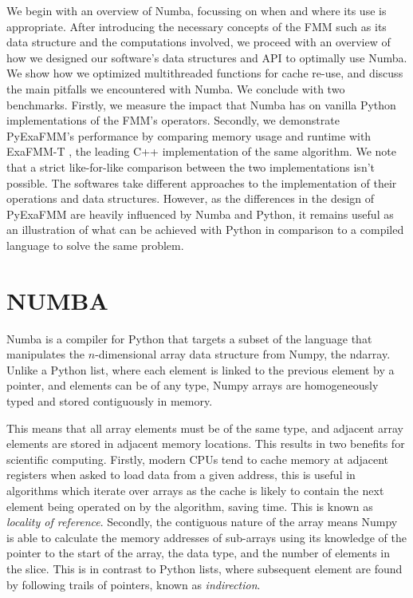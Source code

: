 \documentclass{IEEEcsmag}
\begin{document}
We begin with an overview of Numba, focussing on when and where its use is appropriate. After introducing the necessary concepts of the FMM such as its data structure and the computations involved, we proceed with an overview of how we designed our software's data structures and API to optimally use Numba. We show how we optimized multithreaded functions for cache re-use, and discuss the main pitfalls we encountered with Numba. We conclude with two benchmarks. Firstly, we measure the impact that Numba has on vanilla Python implementations of the FMM's operators. Secondly, we demonstrate PyExaFMM's performance by comparing memory usage and runtime with ExaFMM-T \cite{Wang2021}, the leading C++ implementation of the same algorithm. We note that a strict like-for-like comparison between the two implementations isn't possible. The softwares take different approaches to the implementation of their operations and data structures. However, as the differences in the design of PyExaFMM are heavily influenced by Numba and Python, it remains useful as an illustration of what can be achieved with Python in comparison to a compiled language to solve the same problem.

\section{NUMBA}

Numba is a compiler for Python that targets a subset of the language that manipulates the $n$-dimensional array data structure from Numpy, the ndarray. Unlike a Python list, where each element is linked to the previous element by a pointer, and elements can be of any type, Numpy arrays are homogeneously typed and stored contiguously in memory.

This means that all array elements must be of the same type, and adjacent array elements are stored in adjacent memory locations. This results in two benefits for scientific computing. Firstly, modern CPUs tend to cache memory at adjacent registers when asked to load data from a given address, this is useful in algorithms which iterate over arrays as the cache is likely to contain the next element being operated on by the algorithm, saving time. This is known as \textit{locality of reference}. Secondly, the contiguous nature of the array means Numpy is able to calculate the memory addresses of sub-arrays using its knowledge of the pointer to the start of the array, the data type, and the number of elements in the slice. This is in contrast to Python lists, where subsequent element are found by following trails of pointers, known as \textit{indirection}.
\end{document}
